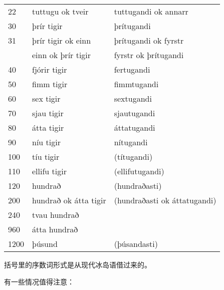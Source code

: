 {{\begin{longtable}{lll}
  22   & tuttugu ok tveir      & tuttugandi ok annarr               \\
  30   & þrír tigir            & þrítugandi                         \\
  31   & þrír tigir ok einn    & þrítugandi ok fyrstr               \\
       & einn ok þrír tigir    & fyrstr ok þrítugandi               \\
  40   & fjórir tigir          & fertugandi                         \\
  50   & fimm tigir            & fimmtugandi                        \\
  60   & sex tigir             & sextugandi                         \\
  70   & sjau tigir            & sjautugandi                        \\
  80   & átta tigir            & áttatugandi                        \\
  90   & níu tigir             & nítugandi                          \\
  100  & tíu tigir             & (títugandi)                        \\
  110  & ellifu tigir          & (ellifutugandi)                    \\
  120  & hundrað               & (hundraðasti)                      \\
  200  & hundrað ok átta tigir & (hundraðasti ok áttatugandi)       \\
  240  & tvau hundrað          &                                    \\
  960  & átta hundrað          &                                    \\
  1200 & þúsund                & (þúsandasti)                       \\
\end{longtable}

括号里的序数词形式是从现代冰岛语借过来的。

有一些情况值得注意：

}}
